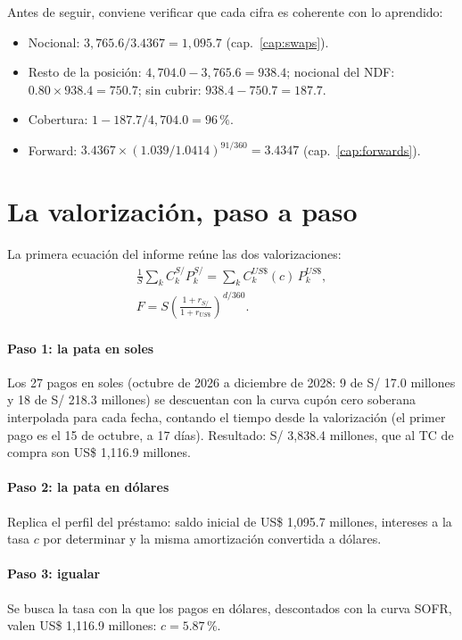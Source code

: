 Antes de seguir, conviene verificar que cada cifra es coherente con lo aprendido:
\begin{itemize}
\item Nocional: $3{,}765.6/3.4367=1{,}095.7$ (cap.~\ref{cap:swaps}).
\item Resto de la posición: $4{,}704.0-3{,}765.6=938.4$; nocional del NDF: $0.80\times938.4=750.7$; sin cubrir: $938.4-750.7=187.7$.
\item Cobertura: $1-187.7/4{,}704.0=96\,\%$.
\item Forward: $3.4367\times(1.039/1.0414)^{91/360}=3.4347$ (cap.~\ref{cap:forwards}).
\end{itemize}

\section{La valorización, paso a paso}

La primera ecuación del informe reúne las dos valorizaciones:
\begin{gather*}
\frac{1}{S}\sum_k C_k^{S/}P_k^{S/}=\sum_k C_k^{US\$}(c)\,P_k^{US\$},\\
F=S\left(\frac{1+r_{S/}}{1+r_{US\$}}\right)^{d/360}.
\end{gather*}

\paragraph{Paso 1: la pata en soles} Los 27 pagos en soles (octubre de 2026 a diciembre de 2028: 9 de S/ 17.0 millones y 18 de S/ 218.3 millones) se descuentan con la curva cupón cero soberana interpolada para cada fecha, contando el tiempo desde la valorización (el primer pago es el 15 de octubre, a 17 días). Resultado: S/ 3,838.4 millones, que al TC de compra son US\$ 1,116.9 millones.

\paragraph{Paso 2: la pata en dólares} Replica el perfil del préstamo: saldo inicial de US\$ 1,095.7 millones, intereses a la tasa $c$ por determinar y la misma amortización convertida a dólares.

\paragraph{Paso 3: igualar} Se busca la tasa con la que los pagos en dólares, descontados con la curva SOFR, valen US\$ 1,116.9 millones: $c=5.87\,\%$.

